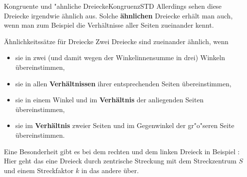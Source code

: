 \begin{MXContent}{Kongruente und "ahnliche Dreiecke}{Kongruenz}{STD}
Allerdings sehen diese Dreiecke irgendwie \"ahnlich aus. Solche \textbf{\"ahnlichen} Dreiecke erh\"alt man auch, wenn man zum Beispiel die Verh\"altnisse aller Seiten zueinander kennt.

\begin{MXInfo}{\"Ahnlichkeitss\"atze f\"ur Dreiecke}
Zwei Dreiecke sind zueinander \"ahnlich, wenn
\begin{itemize}
 \item sie in zwei (und damit wegen der Winkelinnensumme in drei) 
   Winkeln \"ubereinstimmen,
 \item sie in allen \textbf{Verh\"altnissen} ihrer entsprechenden Seiten 
   \"ubereinstimmen,
 \item sie in einem Winkel und im \textbf{Verh\"altnis} der anliegenden 
   Seiten \"ubereinstimmen,
 \item sie im \textbf{Verh\"altnis} zweier Seiten und im Gegenwinkel der 
   gr"o"seren Seite \"ubereinstimmen.
\end{itemize}
\end{MXInfo}

Eine Besonderheit gibt es bei dem rechten und dem linken Dreieck in Beispiel  : Hier geht das eine Dreieck durch zentrische Streckung  mit dem Streckzentrum $S$ und einem Streckfaktor $k$ in das andere \"uber.
\begin{center}
\end{center}

\end{MXContent}


